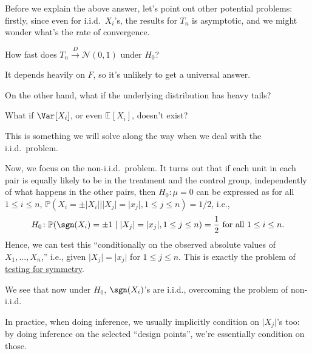 Before we explain the above answer, let's point out other potential problems: firstly, since even for i.i.d.\ \(X_i\)'s, the results for \(T_n\) is asymptotic, and we might wonder what's the rate of convergence.

\begin{problem*}
	How fast does \(T_n \overset{D}{\to} \mathcal{N} (0, 1)\) under \(H_0\)?
\end{problem*}
\begin{answer}
	It depends heavily on \(F\), so it's unlikely to get a universal answer.
\end{answer}

On the other hand, what if the underlying distribution has heavy tails?

\begin{problem*}
	What if \(\Var_{}[X_i] \), or even \(\mathbb{E}_{}[X_i] \), doesn't exist?
\end{problem*}
\begin{answer}
	This is something we will solve along the way when we deal with the i.i.d.\ problem.
\end{answer}

Now, we focus on the non-i.i.d.\ problem. It turns out that if each unit in each pair is equally likely to be in the treatment and the control group, independently of what happens in the other pairs, then \(H_0 \colon \mu = 0\) can be expressed as for all \(1 \leq i \leq n\), \(\mathbb{P} (X_i = \pm \vert X_i \vert \mid \vert X_j \vert = \lvert x_j \rvert , 1 \leq j \leq n) = 1 / 2\), i.e.,
\[
	H_0 \colon
	\mathbb{P} (\sgn (X_i) = \pm 1 \mid \vert X_j \vert = \lvert x_j \rvert , 1 \leq j \leq n)
	= \frac{1}{2} \text{ for all } 1 \leq i \leq n.
\]
Hence, we can test this ``conditionally on the observed absolute values of \(X_1, \dots , X_n\),'' i.e., given \(\lvert X_j \rvert = \lvert x_j \rvert \) for \(1 \leq j \leq n\). This is exactly the problem of \hyperref[prb:testing-symmetry]{testing for symmetry}.

\begin{intuition}
	We see that now under \(H_0\), \(\sgn (X_i)\)'s are i.i.d., overcoming the problem of non-i.i.d.
\end{intuition}

\begin{note}
	In practice, when doing inference, we usually implicitly condition on \(\vert X_j \vert \)'s too: by doing inference on the selected ``design points'', we're essentially condition on those.
\end{note}


